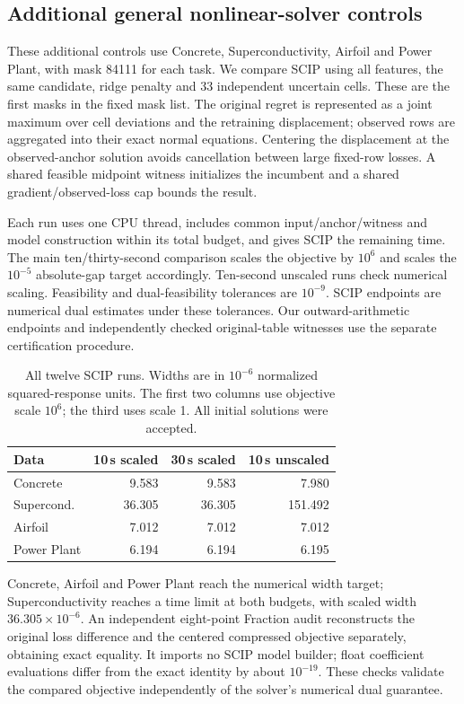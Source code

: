 \subsection{Additional general nonlinear-solver controls}\label{app:scip-followup}
These additional controls use Concrete, Superconductivity, Airfoil and Power Plant, with mask 84111 for each task. We compare SCIP using all features, the same candidate, ridge penalty and 33 independent uncertain cells. These are the first masks in the fixed mask list. The original regret is represented as a joint maximum over cell deviations and the retraining displacement; observed rows are aggregated into their exact normal equations. Centering the displacement at the observed-anchor solution avoids cancellation between large fixed-row losses. A shared feasible midpoint witness initializes the incumbent and a shared gradient/observed-loss cap bounds the result.

Each run uses one CPU thread, includes common input/anchor/witness and model construction within its total budget, and gives SCIP the remaining time. The main ten/thirty-second comparison scales the objective by $10^6$ and scales the $10^{-5}$ absolute-gap target accordingly. Ten-second unscaled runs check numerical scaling. Feasibility and dual-feasibility tolerances are $10^{-9}$. SCIP endpoints are numerical dual estimates under these tolerances. Our outward-arithmetic endpoints and independently checked original-table witnesses use the separate certification procedure.

\begin{table}[t]\centering\small\setlength{\tabcolsep}{5pt}
\caption{All twelve SCIP runs. Widths are in $10^{-6}$ normalized squared-response units. The first two columns use objective scale $10^6$; the third uses scale 1. All initial solutions were accepted.}\label{tab:scip-followup}
\begin{tabular}{lrrr}\toprule
Data&10\,s scaled&30\,s scaled&10\,s unscaled\\\midrule
Concrete & 9.583 & 9.583 & 7.980\\
Supercond. & 36.305 & 36.305 & 151.492\\
Airfoil & 7.012 & 7.012 & 7.012\\
Power Plant & 6.194 & 6.194 & 6.195\\
\bottomrule\end{tabular}\end{table}

Concrete, Airfoil and Power Plant reach the numerical width target; Superconductivity reaches a time limit at both budgets, with scaled width $36.305\times10^{-6}$. An independent eight-point Fraction audit reconstructs the original loss difference and the centered compressed objective separately, obtaining exact equality. It imports no SCIP model builder; float coefficient evaluations differ from the exact identity by about $10^{-19}$. These checks validate the compared objective independently of the solver's numerical dual guarantee.
